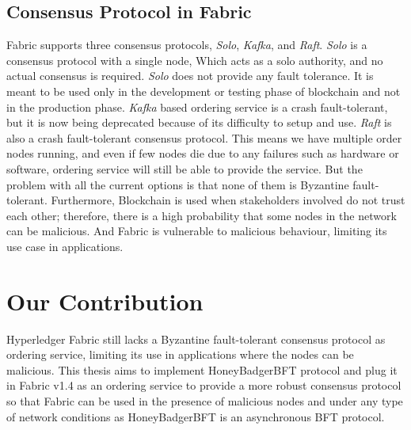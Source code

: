      
\subsection{Consensus Protocol in Fabric}
Fabric supports three consensus protocols, \textit{Solo}, \textit{Kafka}, and \textit{Raft}. \textit{Solo} is a consensus protocol with a single node, Which acts as a solo authority, and no actual consensus is required. \textit{Solo} does not provide any fault tolerance. It is meant to be used only in the development or testing phase of blockchain and not in the production phase. \textit{Kafka} based ordering service is a crash fault-tolerant, but it is now being deprecated because of its difficulty to setup and use. \textit{Raft} is also a crash fault-tolerant consensus protocol. This means we have multiple order nodes running, and even if few nodes die due to any failures such as hardware or software, ordering service will still be able to provide the service.
But the problem with all the current options is that none of them is Byzantine fault-tolerant. Furthermore, Blockchain is used when stakeholders involved do not trust each other; therefore, there is a high probability that some nodes in the network can be malicious. And  Fabric is vulnerable to malicious behaviour, limiting its use case in applications. 
\section{Our Contribution}
Hyperledger Fabric still lacks a Byzantine fault-tolerant consensus protocol as ordering service, limiting its use in applications where the nodes can be malicious. This thesis aims to implement HoneyBadgerBFT protocol and plug it in Fabric v1.4 as an ordering service to provide a more robust consensus protocol so that Fabric can be used in the presence of malicious nodes and under any type of network conditions as HoneyBadgerBFT is an asynchronous BFT protocol.
